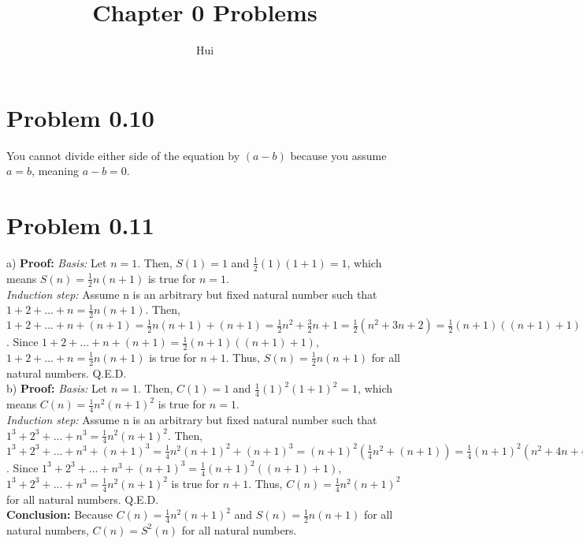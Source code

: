 \documentclass{article}
\begin{document}
\title{Chapter 0 Problems}
\author{Hui}
\date{}
\maketitle

\section{Problem 0.10}
You cannot divide either side of the equation by $(a - b)$ because you assume $a = b$, meaning $a - b = 0$.

\section{Problem 0.11}
a) \textbf{Proof:} \textit{Basis:} Let $n = 1$. Then, $S(1) = 1$ and $\frac{1}{2}(1)(1 + 1) = 1$, which means $S(n) = \frac{1}{2}n(n+1)$ is true for $n = 1$.
\\\textit{Induction step:} Assume n is an arbitrary but fixed natural number such that $1 + 2 + ... + n = \frac{1}{2}n(n+1)$.
Then, $1 + 2 + ... + n + (n + 1) = \frac{1}{2}n(n+1) + (n + 1) = \frac{1}{2}n^2 + \frac{3}{2}n + 1 = \frac{1}{2}(n^2 + 3n + 2) = \frac{1}{2}(n + 1)((n + 1) + 1)$.
Since $1 + 2 + ... + n + (n + 1) = \frac{1}{2}(n + 1)((n + 1) + 1)$, $1 + 2 + ... + n = \frac{1}{2}n(n+1)$ is true for $n + 1$.
Thus, $S(n) = \frac{1}{2}n(n+1)$ for all natural numbers. Q.E.D.
\newline\\ b) \textbf{Proof:} \textit{Basis:} Let $n = 1$. Then, $C(1) = 1$ and $\frac{1}{4}(1)^2(1 + 1)^2 = 1$, which means $C(n) = \frac{1}{4}n^2(n + 1)^2$ is true for $n = 1$.
\\\textit{Induction step:} Assume n is an arbitrary but fixed natural number such that $1^3 + 2^3 + ... + n^3 = \frac{1}{4}n^2(n+1)^2$.
Then, $1^3 + 2^3 + ... + n^3 + (n + 1)^3 = \frac{1}{4}n^2(n+1)^2 + (n + 1)^3 = (n + 1)^2(\frac{1}{4}n^2 + (n + 1)) = \frac{1}{4}(n + 1)^2(n^2 + 4n + 4) = \frac{1}{4}(n + 1)^2((n + 1) + 1)$.
Since $1^3 + 2^3 + ... + n^3 + (n + 1)^3 = \frac{1}{4}(n + 1)^2((n + 1) + 1)$, $1^3 + 2^3 + ... + n^3 = \frac{1}{4}n^2(n+1)^2$ is true for $n + 1$.
Thus, $C(n) = \frac{1}{4}n^2(n + 1)^2$ for all natural numbers. Q.E.D.
\newline\\ \textbf{Conclusion:} Because $C(n) = \frac{1}{4}n^2(n + 1)^2$ and $S(n) = \frac{1}{2}n(n+1)$ for all natural numbers, $C(n) = S^2(n)$ for all natural numbers.
\end{document}
